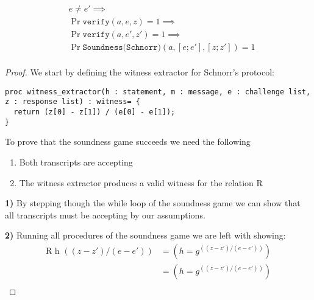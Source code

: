 \begin{lemma}
  \begin{align*}
    &e \neq e' \implies \\
    &\Pr{\texttt{verify}(a, e, z)} = 1 \implies \\
    &\Pr{\texttt{verify}(a, e', z')} = 1 \implies \\
    &\Pr{\texttt{Soundness(Schnorr)}(a, [e; e'], [z; z'])} = 1 \\
  \end{align*}
\end{lemma}
\begin{proof}
  We start by defining the witness extractor for Schnorr's protocol:
\begin{lstlisting}
proc witness_extractor(h : statement, m : message, e : challenge list, z : response list) : witness= {
  return (z[0] - z[1]) / (e[0] - e[1]);
}
\end{lstlisting}
  To prove that the soundness game succeeds we need the following
  \begin{enumerate}
    \item Both transcripts are accepting
    \item The witness extractor produces a valid witness for the relation R
  \end{enumerate}

  \textbf{1)} By stepping though the while loop of the soundness game we can
  show that all transcripts must be accepting by our assumptions.

  \noindent \textbf{2)} Running all procedures of the soundness game we are left
  with showing:
  \begin{align*}
    \text{R h } ((z - z') / (e - e')) &= (h = g ^{((z - z') / (e - e'))}) \\
                                      &= (h = g ^{((z - z') / (e - e'))}) \\
  \end{align*}
\end{proof}

